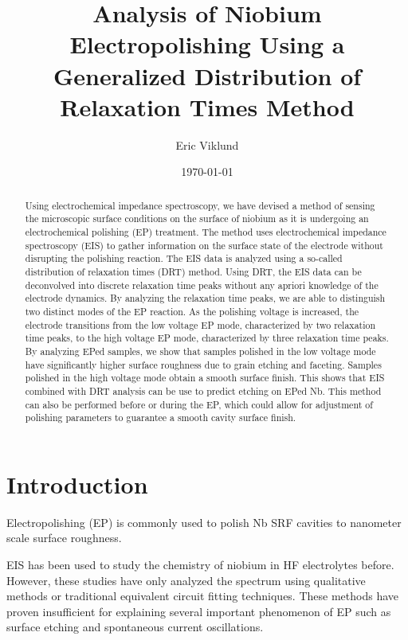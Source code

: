 \documentclass{revtex4-2}
\begin{document}
\title{Analysis of Niobium Electropolishing Using a Generalized Distribution of Relaxation Times Method}
\author{Eric Viklund}
\date{\today}

\begin{abstract}
  Using electrochemical impedance spectroscopy, we have devised a method of sensing the microscopic surface conditions on the surface of niobium as it is undergoing an electrochemical polishing (EP) treatment. The method uses electrochemical impedance spectroscopy (EIS) to gather information on the surface state of the electrode without disrupting the polishing reaction. The EIS data is analyzed using a so-called distribution of relaxation times (DRT) method. Using DRT, the EIS data can be deconvolved into discrete relaxation time peaks without any apriori knowledge of the electrode dynamics. By analyzing the relaxation time peaks, we are able to distinguish two distinct modes of the EP reaction. As the polishing voltage is increased, the electrode transitions from the low voltage EP mode, characterized by two relaxation time peaks, to the high voltage EP mode, characterized by three relaxation time peaks. By analyzing EPed samples, we show that samples polished in the low voltage mode have significantly higher surface roughness due to grain etching and faceting. Samples polished in the high voltage mode obtain a smooth surface finish. This shows that EIS combined with DRT analysis can be use to predict etching on EPed Nb. This method can also be performed before or during the EP, which could allow for adjustment of polishing parameters to guarantee a smooth cavity surface finish.
\end{abstract}

\maketitle



\section{Introduction}
\label{sec:org5ef967f}
Electropolishing (EP) is commonly used to polish Nb SRF cavities to nanometer scale surface roughness. 

EIS has been used to study the chemistry of niobium in HF electrolytes before. However, these studies have only analyzed the spectrum using qualitative methods or traditional equivalent circuit fitting techniques. These methods have proven insufficient for explaining several important phenomenon of EP such as surface etching and spontaneous current oscillations.\cite{cattarin2002nb,Tian_2008,ranjith2018anodic}
\end{document}
